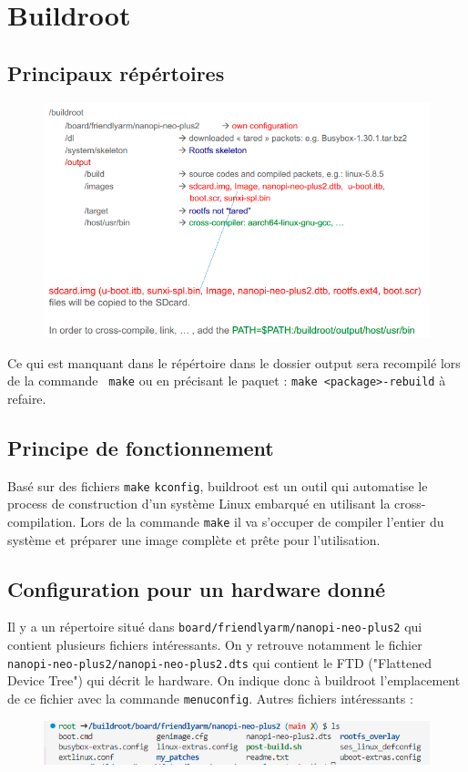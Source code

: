 \section{Buildroot}
\subsection{Principaux répértoires}
\begin{figure}[H]
\centering
\includegraphics[width=0.9\columnwidth]{Figures/buildroot_01.png}
\end{figure}
Ce qui est manquant dans le répértoire dans le dossier output sera recompilé lors de la commande \verb! make! ou en précisant le paquet : \verb!make <package>-rebuild! à refaire.
\subsection{Principe de fonctionnement}
Basé sur des fichiers \verb!make! \verb!kconfig!, buildroot est un outil qui automatise le process de construction d'un système Linux embarqué en utilisant la cross-compilation. Lors de la commande \verb!make! il va s'occuper de compiler l'entier du système et préparer une image complète et prête pour l'utilisation.
\subsection{Configuration pour un hardware donné}
Il y a un répertoire situé dans \verb!board/friendlyarm/nanopi-neo-plus2! qui contient plusieurs fichiers intéressants. On y retrouve notamment le fichier \verb!nanopi-neo-plus2/nanopi-neo-plus2.dts! qui contient le FTD ("Flattened Device Tree") qui décrit le hardware. On indique donc à buildroot l'emplacement de ce fichier avec la commande \verb!menuconfig!. Autres fichiers intéressants : 
\begin{figure}[H]
\centering
\includegraphics[width=0.9\columnwidth]{Figures/buildroot_02.png}
\end{figure}
